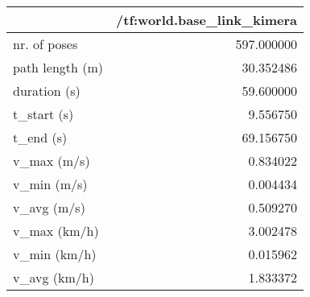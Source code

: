 \begin{tabular}{lr}
\toprule
{} &  /tf:world.base\_link\_kimera \\
\midrule
nr. of poses    &                  597.000000 \\
path length (m) &                   30.352486 \\
duration (s)    &                   59.600000 \\
t\_start (s)     &                    9.556750 \\
t\_end (s)       &                   69.156750 \\
v\_max (m/s)     &                    0.834022 \\
v\_min (m/s)     &                    0.004434 \\
v\_avg (m/s)     &                    0.509270 \\
v\_max (km/h)    &                    3.002478 \\
v\_min (km/h)    &                    0.015962 \\
v\_avg (km/h)    &                    1.833372 \\
\bottomrule
\end{tabular}

